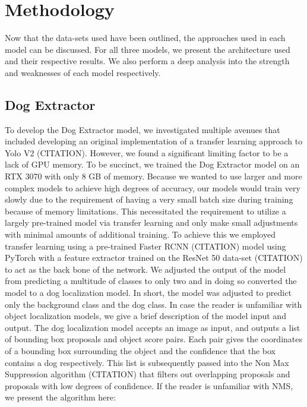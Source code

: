 \documentclass{article}
\begin{document}
\section{Methodology}
Now that the data-sets used have been outlined, the approaches used in each model can be discussed.  For all three models, we present the architecture used and their respective results.  We also perform a deep analysis into the strength and weaknesses of each model respectively.  

\subsection{Dog Extractor}

To develop the Dog Extractor model, we investigated multiple avenues that included developing an original implementation of a transfer learning approach to Yolo V2 (CITATION).  However, we found a significant limiting factor to be a lack of GPU memory.  To be succinct, we trained the Dog Extractor model on an RTX 3070 with only 8 GB of memory.  Because we wanted to use larger and more complex models to achieve high degrees of accuracy, our models would train very slowly due to the requirement of having a very small batch size during training because of memory limitations.  This necessitated the requirement to utilize a largely pre-trained model via transfer learning and only make small adjustments with minimal amounts of additional training.  To achieve this we employed transfer learning using a pre-trained Faster RCNN (CITATION) model using PyTorch with a feature extractor trained on the ResNet 50 data-set (CITATION) to act as the back bone of the network.  We adjusted the output of the model from predicting a multitude of classes to only two and in doing so converted the model to a dog localization model.  In short, the model was adjusted to predict only the background class and the dog class.  In case the reader is unfamiliar with object localization models, we give a brief description of the model input and output.  The dog localization model accepts an image as input, and outputs a list of bounding box proposals and object score pairs.  Each pair gives the coordinates of a bounding box surrounding the object and the confidence that the box contains a dog respectively.  This list is subsequently passed into the Non Max Suppression algorithm (CITATION) that filters out overlapping proposals and proposals with low degrees of confidence.  If the reader is unfamiliar with NMS, we present the algorithm here: \\
\end{document}

